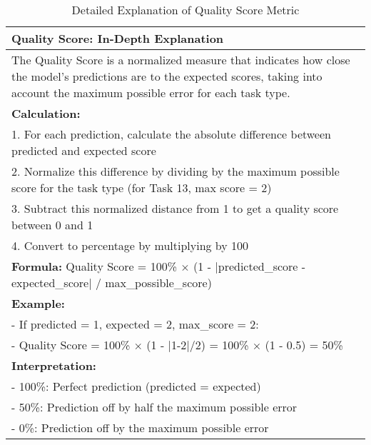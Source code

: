 \begin{table}[htbp]
\centering
\caption{Detailed Explanation of Quality Score Metric}
\begin{tabular}{p{12cm}}
\toprule
\textbf{Quality Score: In-Depth Explanation} \\
\midrule
The Quality Score is a normalized measure that indicates how close the model's predictions are to the expected scores, taking into account the maximum possible error for each task type. \\
\addlinespace
\textbf{Calculation:} \\
1. For each prediction, calculate the absolute difference between predicted and expected score \\
2. Normalize this difference by dividing by the maximum possible score for the task type (for Task 13, max score = 2) \\
3. Subtract this normalized distance from 1 to get a quality score between 0 and 1 \\
4. Convert to percentage by multiplying by 100 \\
\addlinespace
\textbf{Formula:} Quality Score = 100\% $\times$ (1 - $|$predicted\_score - expected\_score$|$ / max\_possible\_score) \\
\addlinespace
\textbf{Example:} \\
- If predicted = 1, expected = 2, max\_score = 2: \\
- Quality Score = 100\% $\times$ (1 - $|$1-2$|$/2) = 100\% $\times$ (1 - 0.5) = 50\% \\
\addlinespace
\textbf{Interpretation:} \\
- 100\%: Perfect prediction (predicted = expected) \\
- 50\%: Prediction off by half the maximum possible error \\
- 0\%: Prediction off by the maximum possible error \\
\bottomrule
\end{tabular}
\end{table}